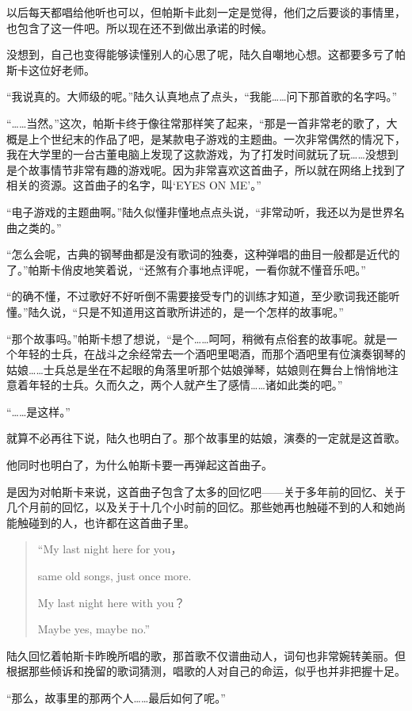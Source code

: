 以后每天都唱给他听也可以，但帕斯卡此刻一定是觉得，他们之后要谈的事情里，也包含了这一件吧。所以现在还不到做出承诺的时候。

没想到，自己也变得能够读懂别人的心思了呢，陆久自嘲地心想。这都要多亏了帕斯卡这位好老师。

“我说真的。大师级的呢。”陆久认真地点了点头，“我能……问下那首歌的名字吗。”

“……当然。”这次，帕斯卡终于像往常那样笑了起来，“那是一首非常老的歌了，大概是上个世纪末的作品了吧，是某款电子游戏的主题曲。一次非常偶然的情况下，我在大学里的一台古董电脑上发现了这款游戏，为了打发时间就玩了玩……没想到是个故事情节非常有趣的游戏呢。因为非常喜欢这首曲子，所以就在网络上找到了相关的资源。这首曲子的名字，叫‘EYES ON ME’。”

“电子游戏的主题曲啊。”陆久似懂非懂地点点头说，“非常动听，我还以为是世界名曲之类的。”

“怎么会呢，古典的钢琴曲都是没有歌词的独奏，这种弹唱的曲目一般都是近代的了。”帕斯卡俏皮地笑着说，“还煞有介事地点评呢，一看你就不懂音乐吧。”

“的确不懂，不过歌好不好听倒不需要接受专门的训练才知道，至少歌词我还能听懂。”陆久说，“只是不知道用这首歌所讲述的，是一个怎样的故事呢。”

“那个故事吗。”帕斯卡想了想说，“是个……呵呵，稍微有点俗套的故事呢。就是一个年轻的士兵，在战斗之余经常去一个酒吧里喝酒，而那个酒吧里有位演奏钢琴的姑娘……士兵总是坐在不起眼的角落里听那个姑娘弹琴，姑娘则在舞台上悄悄地注意着年轻的士兵。久而久之，两个人就产生了感情……诸如此类的吧。”

“……是这样。”

就算不必再往下说，陆久也明白了。那个故事里的姑娘，演奏的一定就是这首歌。

他同时也明白了，为什么帕斯卡要一再弹起这首曲子。

是因为对帕斯卡来说，这首曲子包含了太多的回忆吧——关于多年前的回忆、关于几个月前的回忆，以及关于十几个小时前的回忆。那些她再也触碰不到的人和她尚能触碰到的人，也许都在这首曲子里。
\begin{verse}
“My last night here for you， 

same old songs, just once more. 

My last night here with you？ 

Maybe yes, maybe no.”
\end{verse}

陆久回忆着帕斯卡昨晚所唱的歌，那首歌不仅谱曲动人，词句也非常婉转美丽。但根据那些倾诉和挽留的歌词猜测，唱歌的人对自己的命运，似乎也并非把握十足。

“那么，故事里的那两个人……最后如何了呢。”

